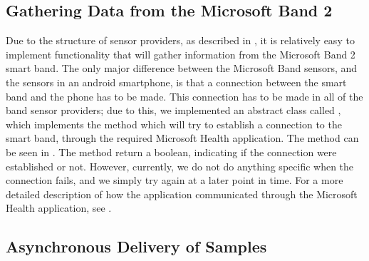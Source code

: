 
\FloatBarrier

\subsection{Gathering Data from the Microsoft Band 2}
Due to the structure of sensor providers, as described in , it is relatively easy to implement functionality that will gather information from the Microsoft Band 2 smart band. The only major difference between the Microsoft Band sensors, and the sensors in an android smartphone, is that a connection between the smart band and the phone has to be made. This connection has to be made in all of the band sensor providers; due to this, we implemented an abstract class called , which implements the method  which will try to establish a connection to the smart band, through the required Microsoft Health application. The method can be seen in . The method return a boolean, indicating if the connection were established or not. However, currently, we do not do anything specific when the connection fails, and we simply try again at a later point in time. For a more detailed description of how the application communicated through the Microsoft Health application, see .


\FloatBarrier

\subsection{Asynchronous Delivery of Samples}

